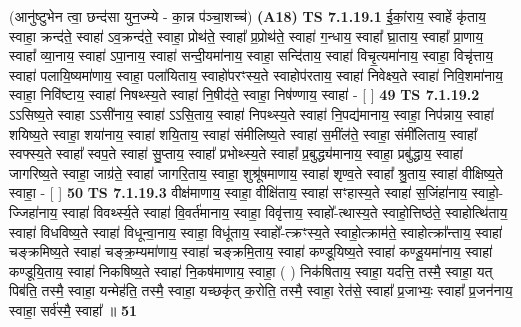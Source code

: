 \documentclass[17pt]{extarticle}
\begin{document}
                  \newline
                      (आनु॑ष्टुभेन त्वा॒ छन्द॑सा युन॒ज्म्ये - का॒न्न प॑ञ्चा॒शच्च॑)  \textbf{(A18)} \newline \newline
                                        \textbf{ TS 7.1.19.1} \newline
                  ई॒कां॒राय॒ स्वाहें कृ॑ताय॒ स्वाहा॒ क्रन्द॑ते॒ स्वाहा॑ ऽव॒क्रन्द॑ते॒ स्वाहा॒ प्रोथ॑ते॒ स्वाहा᳚ प्र॒प्रोथ॑ते॒ स्वाहा॑ ग॒न्धाय॒ स्वाहा᳚ घ्रा॒ताय॒ स्वाहा᳚ प्रा॒णाय॒ स्वाहा᳚ व्या॒नाय॒ स्वाहा॑ ऽपा॒नाय॒ स्वाहा॑ सन्दी॒यमा॑नाय॒ स्वाहा॒ सन्दि॑ताय॒ स्वाहा॑ विचृ॒त्यमा॑नाय॒ स्वाहा॒ विचृ॑त्ताय॒ स्वाहा॑ पलायि॒ष्यमा॑णाय॒ स्वाहा॒ पला॑यिताय॒ स्वाहो॑परꣳस्य॒ते स्वाहोप॑रताय॒ स्वाहा॑ निवेक्ष्य॒ते स्वाहा॑ निवि॒शमा॑नाय॒ स्वाहा॒ निवि॑ष्टाय॒ स्वाहा॑ निषथ्स्य॒ते स्वाहा॑ नि॒षीद॑ते॒ स्वाहा॒ निष॑ण्णाय॒ स्वाहा॑ - [  ] \textbf{  49} \newline
                  \newline
                                \textbf{ TS 7.1.19.2} \newline
                  ऽऽसिष्य॒ते स्वाहा ऽऽसी॑नाय॒ स्वाहा॑ ऽऽसि॒ताय॒ स्वाहा॑ निपथ्स्य॒ते स्वाहा॑ नि॒पद्य॑मानाय॒ स्वाहा॒ निप॑न्नाय॒ स्वाहा॑ शयिष्य॒ते स्वाहा॒ शया॑नाय॒ स्वाहा॑ शयि॒ताय॒ स्वाहा॑ संमीलिष्य॒ते स्वाहा॑ स॒मींल॑ते॒ स्वाहा॒ संमी॑लिताय॒ स्वाहा᳚ स्वफ्स्य॒ते स्वाहा᳚ स्वप॒ते स्वाहा॑ सु॒प्ताय॒ स्वाहा᳚ प्रभोथ्स्य॒ते स्वाहा᳚ प्र॒बुद्ध्य॑मानाय॒ स्वाहा॒ प्रबु॑द्धाय॒ स्वाहा॑ जागरिष्य॒ते स्वाहा॒ जाग्र॑ते॒ स्वाहा॑ जागरि॒ताय॒ स्वाहा॒ शुश्रू॑षमाणाय॒ स्वाहा॑ शृण्व॒ते स्वाहा᳚ श्रु॒ताय॒ स्वाहा॑ वीक्षिष्य॒ते स्वाहा॒ - [  ] \textbf{  50} \newline
                  \newline
                                \textbf{ TS 7.1.19.3} \newline
                  वीक्ष॑माणाय॒ स्वाहा॒ वीक्षि॑ताय॒ स्वाहा॑ सꣳहास्य॒ते स्वाहा॑ स॒जिंहा॑नाय॒ स्वाहो॒-ज्जिहा॑नाय॒ स्वाहा॑ विवर्थ्स्य॒ते स्वाहा॑ वि॒वर्त॑मानाय॒ स्वाहा॒ विवृ॑त्ताय॒ स्वाहो᳚-त्थास्य॒ते स्वाहो॒त्तिष्ठ॑ते॒ स्वाहोत्थि॑ताय॒ स्वाहा॑ विधविष्य॒ते स्वाहा॑ विधून्वा॒नाय॒ स्वाहा॒ विधू॑ताय॒ स्वाहो᳚-त्क्रꣳस्य॒ते स्वाहो॒त्क्राम॑ते॒ स्वाहोत्क्रा᳚न्ताय॒ स्वाहा॑ चङ्क्रमिष्य॒ते स्वाहा॑ चङ्क्र॒म्यमा॑णाय॒ स्वाहा॑ चङ्क्रमि॒ताय॒ स्वाहा॑ कण्डूयिष्य॒ते स्वाहा॑ कण्डू॒यमा॑नाय॒ स्वाहा॑ कण्डूयि॒ताय॒ स्वाहा॑ निकषिष्य॒ते स्वाहा॑ नि॒कष॑माणाय॒ स्वाहा॒ ( ) निक॑षिताय॒ स्वाहा॒ यदत्ति॒ तस्मै॒ स्वाहा॒ यत् पिब॑ति॒ तस्मै॒ स्वाहा॒ यन्मेह॑ति॒ तस्मै॒ स्वाहा॒ यच्छकृ॑त् क॒रोति॒ तस्मै॒ स्वाहा॒ रेत॑से॒ स्वाहा᳚ प्र॒जाभ्यः॒ स्वाहा᳚ प्र॒जन॑नाय॒ स्वाहा॒ सर्व॑स्मै॒ स्वाहा᳚ ॥ \textbf{  51 } \newline
\end{document}
